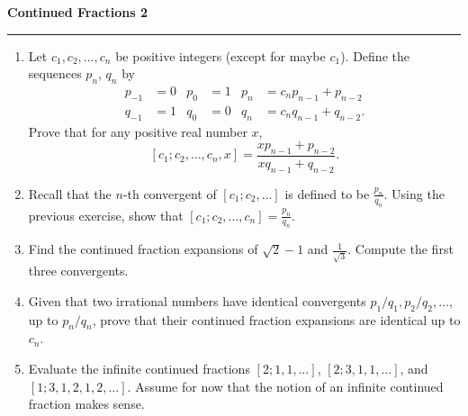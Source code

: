 \documentclass[12pt]{article}
\begin{document}
\begin{center}
{\bf \Large Continued Fractions 2}
\vspace{0.2cm}
\hrule
\end{center}

\begin{enumerate}
	\item Let $c_1, c_2, \ldots, c_n$ be positive integers (except for maybe $c_1$). Define the sequences $p_n$, $q_n$ by
	\begin{align*}
		p_{-1}&=0 & p_0&=1 & p_n&= c_np_{n-1}+p_{n-2}\\
		q_{-1}&=1 & q_0&=0 & q_n&= c_nq_{n-1}+q_{n-2}.
	\end{align*}
	Prove that for any positive real number $x$,
	\[
	[c_1;c_2, \ldots, c_n, x] = \frac{xp_{n-1}+p_{n-2}}{xq_{n-1}+q_{n-2}}.
	\]

	\vfill

	\item Recall that the $n$-th convergent of $[c_1; c_2, \ldots]$ is defined to be $\frac{p_n}{q_n}$. Using the previous exercise, show that $[c_1; c_2, \ldots, c_n] = \frac{p_n}{q_n}$.
	\vfill
	\item Find the continued fraction expansions of $\sqrt{2}-1$ and $\frac{1}{\sqrt{3}}$. Compute the first three convergents.
	\vfill
	\item Given that two irrational numbers have identical convergents $p_1/q_1, p_2/q_2, \ldots$, up to $p_n/q_n$, prove that their continued fraction expansions are identical up to $c_n$.
	\vfill
	\item Evaluate the infinite continued fractions $[2;1, 1, \ldots]$, $[2;3, 1, 1, \ldots]$, and $[1;3, 1, 2, 1, 2, \ldots]$. Assume for now that the notion of an infinite continued fraction makes sense.
	\vfill
\end{enumerate}
\end{document}
